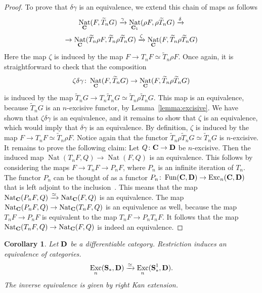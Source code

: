 \documentclass[psamsfonts]{amsart}
\theoremstyle{plain}
\newtheorem{cor}[thm]{Corollary}
\theoremstyle{definition}
\theoremstyle{remark}
\newtheorem{rem}[thm]{Remark}
\newcommand{\catname}[1]{{\normalfont\textbf{#1}}}
\newcommand{\spaces}{\catname{S}_*}
\newcommand{\connected}{\spaces^{1}}
\DeclareMathOperator{\nat}{Nat}
\DeclareMathOperator{\fun}{Fun}
\DeclareMathOperator{\exc}{Exc}
\begin{document}
\begin{proof}
To prove that $\delta\gamma$ is an equivalence, we extend this chain of maps as follows
\begin{multline*}
\nat_{\catname{C}}(F, \widetilde T_nG)\xrightarrow{\gamma}  \nat_{\catname{C}_1}(\rho F, \rho\widetilde T_n G) \xrightarrow{\delta} \\ \to \nat_{\catname{C}}(\widetilde T_n \rho F, \widetilde T_n \rho \widetilde T_n G) \xrightarrow{\zeta} 
 \nat_{\catname{C}}( F, \widetilde T_n \rho \widetilde T_n G) 
\end{multline*}
Here the map $\zeta$ is induced by the map $F\to T_nF \simeq \widetilde T_n \rho F$. Once again, it is straightforward to check that the composition
\[
\zeta\delta\gamma\colon \nat_{\catname{C}}(F, \widetilde T_nG)\to  \nat_{\catname{C}}( F, \widetilde T_n \rho \widetilde T_n G) 
\]
is induced by the map $\widetilde T_n G \to T_n\widetilde T_n G\simeq  \widetilde T_n \rho \widetilde T_n G$. This map is an equivalence, because $\widetilde T_n G$ is an $n$-excisive functor, by Lemma~\ref{lemma:excisive}. We have shown that $\zeta\delta\gamma$ is an equivalence, and it remains to show that $\zeta$ is an equivalence, which would imply that $\delta\gamma$ is an equivalence. By definition, $\zeta$ is induced by the map $F\to T_n F \simeq \widetilde T_n\rho F$. Notice again that the functor $\widetilde T_n \rho\widetilde T_n G\simeq \widetilde T_n G$ is $n$-excisive. It remains to prove the following claim: Let $Q\colon \catname{C}\to \catname{D}$ be $n$-excisive. Then the induced map $\nat(T_n F, Q) \to \nat(F, Q)$ is an equivalence. This follows by considering the maps $F\to T_n F\to P_nF$, where $P_n$ is an infinite iteration of $T_n$. The functor $P_n$ can be thought of as a functor $P_n\colon\fun(\catname{C}, \catname{D})\to \exc_n(\catname{C}, \catname{D})$ that is left adjoint to the inclusion~\cite[Theorem 6.1.1.10]{LurieHA}. This means that the map $\nat_{\catname{C}}(P_n F, Q) \xrightarrow {\simeq}\nat_{\catname{C}}(F, Q)$ is an equivalence. The map $\nat_{\catname{C}}(P_n F, Q)\to \nat_{\catname{C}}(T_n F, Q)$ is an equivalence as well, because the map $T_n F\to P_nF$ is equivalent to the map $T_nF\to P_nT_nF$. It follows that the map $\nat_{\catname{C}}(T_n F, Q) \to \nat_{\catname{C}}(F, Q)$ is indeed an equivalence.
\end{proof}
\begin{cor}\label{cor:restriction}
Let $\catname{D}$ be a differentiable category. Restriction induces an equivalence of categories.
\[
\exc_n(\spaces, \catname{D})\xrightarrow{\simeq} \exc_n(\connected, \catname{D}).
\]
The inverse equivalence is given by right Kan extension.
\end{cor}
\end{document}
